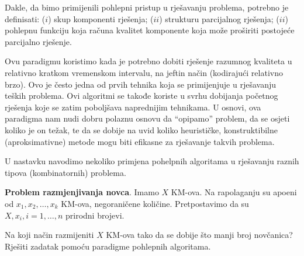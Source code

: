 Dakle, da bimo primijenili pohlepni pristup u rješavanju problema, potrebno je definisati: ($i$) skup komponenti rješenja; ($ii$) strukturu parcijalnog rješenja; ($ii$) pohlepnu funkciju koja računa kvalitet komponente koja može proširiti postojeće parcijalno rješenje. 



Ovu paradigmu koristimo kada je potrebno dobiti rješenje razumnog kvaliteta   u relativno kratkom vremenskom intervalu, na jeftin način (kodirajući relativno brzo). Ovo je često jedna od prvih tehnika koja se primijenjuje u rješavanju teških 
problema.  Ovi algoritmi se takođe koriste u svrhu dobijanja početnog rješenja koje se zatim  poboljšava naprednijim tehnikama. U osnovi, ova paradigma nam nudi dobru polaznu osnovu da ``opipamo'' problem, da se osjeti  koliko je on težak, te da se dobije na uvid koliko heurističke, konstruktibilne (aproksimativne) metode mogu biti efikasne za rješavanje takvih problema.

U nastavku navodimo nekoliko primjena pohelpnih algoritama u rješavanju raznih tipova (kombinatornih) problema. 



\begin{example}\textbf{Problem razmjenjivanja novca}. 
 Imamo  $X$ KM-ova. Na rapolaganju su apoeni od $x_1, x_2, \ldots , x_k$ KM-ova, negoraničene količine. Pretpostavimo da su $X, x_i, i=1,\ldots, n$ prirodni brojevi.

Na koji način razmijeniti $X$ KM-ova tako da se dobije što manji broj
novčanica? Rješiti zadatak pomoću paradigme pohlepnih algoritama.
\end{example}

